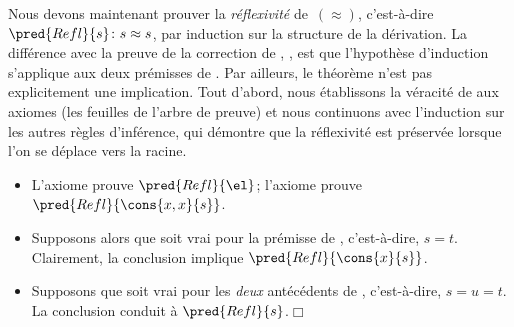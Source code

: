 Nous devons maintenant prouver la \emph{réflexivité} de~\((\approx)\),
c'est-à-dire \(\pred{Refl}{s} \colon s
\approx s\), par induction sur la structure
de la dérivation. La différence avec la preuve de la correction de
, , est que
l'hypothèse d'induction s'applique aux deux prémisses de
. Par ailleurs, le théorème n'est pas explicitement une
implication. Tout d'abord, nous établissons la véracité de
 aux axiomes (les feuilles de l'arbre de preuve) et
nous continuons avec l'induction sur les autres règles d'inférence,
qui démontre que la réflexivité est préservée lorsque l'on se déplace
vers la racine.
\begin{itemize}

  \item L'axiome  prouve \(\pred{Refl}{\el}\); l'axiome
   prouve \(\pred{Refl}{\cons{x,x}{s}}\).

  \item Supposons alors que  soit vrai pour la prémisse
    de , c'est-à-dire, \(s = t\). Clairement, la
    conclusion implique \(\pred{Refl}{\cons{x}{s}}\).

  \item Supposons que  soit vrai pour les \emph{deux}
    antécédents de , c'est-à-dire, \(s=u=t\). La
    conclusion conduit à
    \(\pred{Refl}{s}\).\hfill\(\Box\)

\end{itemize}

